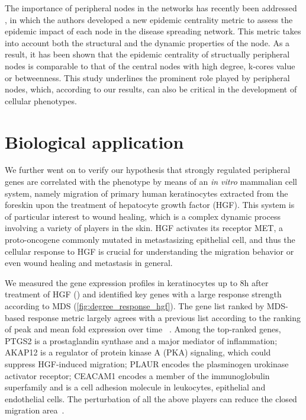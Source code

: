 The importance of peripheral nodes in the networks has recently been addressed~%
\citep{Sikic2011}, in which the authors developed a new epidemic centrality
metric to assess the epidemic impact of each node in the disease spreading
network. This metric takes into account both the structural and 
the dynamic properties of the node. As a result,
it has been shown that the epidemic centrality of structually peripheral nodes is 
comparable to that of the central nodes with high degree, k-cores value or 
betweenness. This study underlines the prominent role played by peripheral
nodes, which, according to our results, can also be critical in the 
development of cellular phenotypes.

\section{Biological application}
We further went on to verify our hypothesis that strongly regulated peripheral 
genes are correlated with the phenotype by means of an \emph{in vitro}
mammalian cell system, namely migration of primary human keratinocytes extracted from the foreskin
upon the treatment of hepatocyte growth factor (HGF). 
This system is of particular interest to wound healing, which is a complex 
dynamic process involving a variety of players in the skin.
HGF activates its receptor MET, a proto-oncogene commonly mutated in 
metastasizing epithelial cell, and thus the cellular response to HGF is 
crucial for understanding the migration behavior or even wound healing and 
metastasis in general. 

We measured
the gene expression profiles in keratinocytes up to 8h after treatment of HGF (\citealp{Busch2008}) 
and identified
key genes with a large response strength according to MDS 
(\ref{fig:degree_response_hgf}). The gene list 
ranked by MDS-based response metric largely agrees with a previous list 
according to the ranking of peak and mean fold expression over time~%
\citep{Busch2008}. Among the top-ranked genes, PTGS2 is a prostaglandin 
synthase and a major mediator of inflammation; AKAP12 is a regulator 
of protein kinase A (PKA) signaling, which could suppress HGF-induced 
migration; PLAUR encodes the plasminogen urokinase activator receptor;
CEACAM1 encodes a member of the immunoglobulin superfamily and is a
cell adhesion molecule in leukocytes, epithelial and endothelial cells.
The perturbation of all the above players can reduce the closed migration 
area~\citep{Busch2008,Schnickmann2009}.

